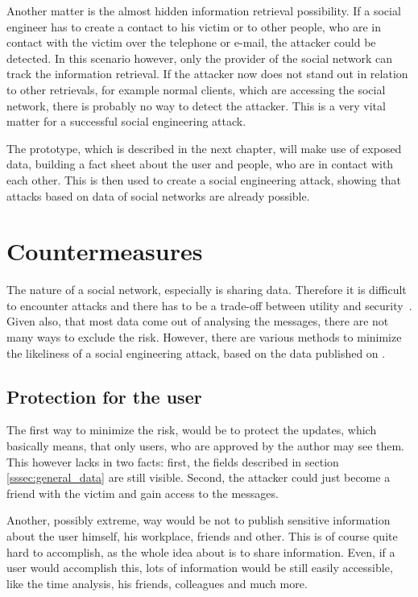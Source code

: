 Another matter is the almost hidden information retrieval possibility. If a
social engineer has to create a contact to his victim or to other people, who
are in contact with the victim over the telephone or e-mail, the attacker could
be detected. In this scenario however, only the provider of the social network
can track the information retrieval. If the attacker now does not stand out in
relation to other retrievals, for example normal clients, which are accessing the social
network, there is probably no way to detect the attacker. This is a very vital
matter for a successful social engineering attack.

The prototype, which is described in the next chapter, will make use of exposed
data, building a fact sheet about the user and people, who are in contact with
each other. This is then used to create a social engineering attack, showing
that attacks based on data of social networks are already possible.

\section{Countermeasures}

The nature of a social network, especially \Twitter{} is sharing data.
Therefore it is difficult to encounter attacks and there has to be a trade-off
between utility and security~\cite{brown2008}. Given also, that most data come
out of analysing the messages, there are not many ways to exclude the risk.
However, there are various methods to minimize the likeliness of a social
engineering attack, based on the data published on \Twitter{}.

\subsection{Protection for the user}

The first way to minimize the risk, would be to protect the updates, which
basically means, that only users, who are approved by the author may see them.
This however lacks in two facts: first, the fields described in section
\ref{sssec:general_data} are still visible. Second, the attacker could just
become a friend with the victim and gain access to the messages.

Another, possibly extreme, way would be not to publish sensitive information
about the user himself, his workplace, friends and other. This is of course
quite hard to accomplish, as the whole idea about \Twitter{} is to share
information. Even, if a user would accomplish this, lots of information would
be still easily accessible, like the time analysis, his friends, colleagues
and much more.

